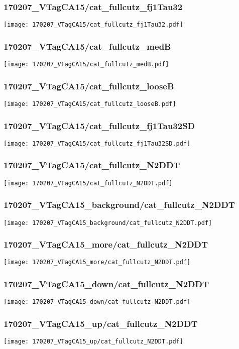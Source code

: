 \begin{frame}
   \frametitle{\small 170207\_VTagCA15/cat\_fullcutz\_fj1Tau32}
   \centering
   \texttt{[image: 170207\_VTagCA15/cat\_fullcutz\_fj1Tau32.pdf]}
\end{frame}

\begin{frame}
   \frametitle{\small 170207\_VTagCA15/cat\_fullcutz\_medB}
   \centering
   \texttt{[image: 170207\_VTagCA15/cat\_fullcutz\_medB.pdf]}
\end{frame}

\begin{frame}
   \frametitle{\small 170207\_VTagCA15/cat\_fullcutz\_looseB}
   \centering
   \texttt{[image: 170207\_VTagCA15/cat\_fullcutz\_looseB.pdf]}
\end{frame}

\begin{frame}
   \frametitle{\small 170207\_VTagCA15/cat\_fullcutz\_fj1Tau32SD}
   \centering
   \texttt{[image: 170207\_VTagCA15/cat\_fullcutz\_fj1Tau32SD.pdf]}
\end{frame}

\begin{frame}
   \frametitle{\small 170207\_VTagCA15/cat\_fullcutz\_N2DDT}
   \centering
   \texttt{[image: 170207\_VTagCA15/cat\_fullcutz\_N2DDT.pdf]}
\end{frame}

\begin{frame}
   \frametitle{\small 170207\_VTagCA15\_background/cat\_fullcutz\_N2DDT}
   \centering
   \texttt{[image: 170207\_VTagCA15\_background/cat\_fullcutz\_N2DDT.pdf]}
\end{frame}

\begin{frame}
   \frametitle{\small 170207\_VTagCA15\_more/cat\_fullcutz\_N2DDT}
   \centering
   \texttt{[image: 170207\_VTagCA15\_more/cat\_fullcutz\_N2DDT.pdf]}
\end{frame}

\begin{frame}
   \frametitle{\small 170207\_VTagCA15\_down/cat\_fullcutz\_N2DDT}
   \centering
   \texttt{[image: 170207\_VTagCA15\_down/cat\_fullcutz\_N2DDT.pdf]}
\end{frame}

\begin{frame}
   \frametitle{\small 170207\_VTagCA15\_up/cat\_fullcutz\_N2DDT}
   \centering
   \texttt{[image: 170207\_VTagCA15\_up/cat\_fullcutz\_N2DDT.pdf]}
\end{frame}

